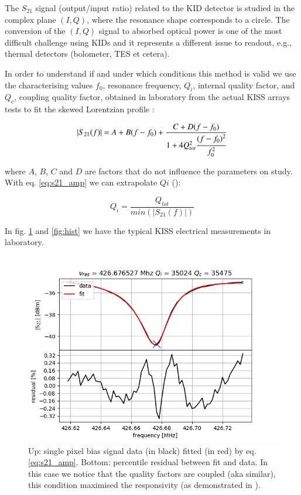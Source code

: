 \documentclass[twocolumn,traditabstract]{aa}\\
\begin{document}
The $S_{21}$ signal (output/input ratio) related to the KID detector is studied in the complex plane $(I,Q)$, where the resonance shape corresponds to a circle.
The conversion of the $(I,Q)$ signal to absorbed optical power is one of the most difficult challenge using KIDs and it represents a different issue to readout, e.g., thermal detectors (bolometer, TES et cetera).

In order to understand if and under which conditions this method is valid we use the characterising values $f_0$, resonance frequency, $Q_i$, internal quality factor, and $Q_c$, coupling quality factor, obtained in laboratory from the actual KISS arrays tests to fit the skewed Lorentzian profile \cite{Gao}:

\begin{equation}
\left|S_{21}(f)\right|= A+B(f-f_0)+\frac{C+D(f-f_0)}{1+4Q_{tot}^2\cfrac{(f-f_0)^2}{f_0^2}}
\label{eq:s21_amp}
\end{equation}

\noindent where $A$, $B$, $C$ and $D$ are factors that do not influence the parameters on study. With eq. \ref{eq:s21_amp} we can extrapolate $Qi$ (\cite{Gao}):

\begin{equation}
Q_i =\frac{Q_{tot}}{min(\left|S_{21}(f)\right|)}
\end{equation}

In fig. \ref{fig:fit_amp} and \ref{fig:hist} we have the typical KISS electrical measurements in laboratory.

\begin{figure}[htf]
	\centering
	\includegraphics[width=.5\textwidth]{3.acqui/resonance_fit.png}
	\caption{Up: single pixel bias signal data (in black) fitted (in red) by eq. \ref{eq:s21_amp}. Bottom: percentile residual between fit and data. In this case we notice that the quality factors are coupled (aka similar), this condition maximised the responsivity (as demonstrated in \cite{Gao}).}
	\label{fig:fit_amp}
\end{figure}
\end{document}
